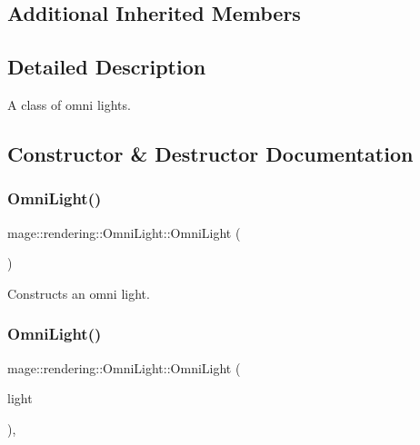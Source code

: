 \subsection*{Additional Inherited Members}


\subsection{Detailed Description}
A class of omni lights. 

\subsection{Constructor \& Destructor Documentation}
\hypertarget{classmage_1_1rendering_1_1_omni_light_a641472ade99dc84b6e82e3d01d8b574a}{}\label{classmage_1_1rendering_1_1_omni_light_a641472ade99dc84b6e82e3d01d8b574a} 
\subsubsection{\texorpdfstring{Omni\+Light()}{OmniLight()}\hspace{0.1cm}{\footnotesize\ttfamily [1/3]}}
{\footnotesize\ttfamily mage\+::rendering\+::\+Omni\+Light\+::\+Omni\+Light (\begin{DoxyParamCaption}{ }\end{DoxyParamCaption})\hspace{0.3cm}{\ttfamily [noexcept]}}

Constructs an omni light. \hypertarget{classmage_1_1rendering_1_1_omni_light_adc27e555c730dbe8891e6ac4eb9d3900}{}\label{classmage_1_1rendering_1_1_omni_light_adc27e555c730dbe8891e6ac4eb9d3900} 
\subsubsection{\texorpdfstring{Omni\+Light()}{OmniLight()}\hspace{0.1cm}{\footnotesize\ttfamily [2/3]}}
{\footnotesize\ttfamily mage\+::rendering\+::\+Omni\+Light\+::\+Omni\+Light (\begin{DoxyParamCaption}\item[{const \hyperlink{classmage_1_1rendering_1_1_omni_light}{Omni\+Light} \&}]{light }\end{DoxyParamCaption})\hspace{0.3cm}{\ttfamily [default]}, {\ttfamily [noexcept]}}

